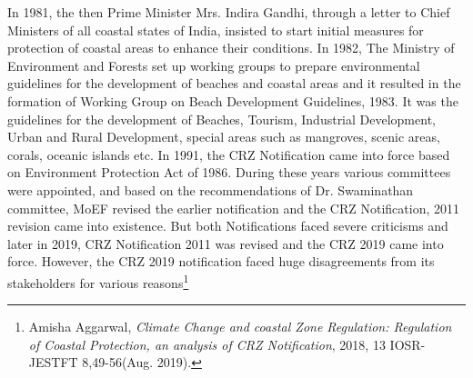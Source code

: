 \begin{multicols}{2}

\noi
In 1981, the then Prime Minister Mrs. Indira Gandhi, through a letter to Chief Ministers of all
coastal states of India, insisted to start initial measures for protection of coastal areas to
enhance their conditions. In 1982, The Ministry of Environment and Forests set up working
groups to prepare environmental guidelines for the development of beaches and coastal areas
and it resulted in the formation of Working Group on Beach Development Guidelines, 1983.
It was the guidelines for the development of Beaches, Tourism, Industrial Development,
Urban and Rural Development, special areas such as mangroves, scenic areas, corals, oceanic
islands etc. In 1991, the CRZ Notification came into force based on Environment Protection
Act of 1986. During these years various committees were appointed, and based on the
recommendations of Dr. Swaminathan committee, MoEF revised the earlier notification and the CRZ Notification, 2011 revision came into existence. But both Notifications faced severe
criticisms and later in 2019, CRZ Notification 2011 was revised and the CRZ 2019 came into
force. However, the CRZ 2019 notification faced huge disagreements from its stakeholders
for various reasons\footnote{Amisha Aggarwal, \textit{Climate Change and coastal Zone Regulation: Regulation of Coastal Protection, an analysis of CRZ Notification}, 2018, 13 IOSR-JESTFT 8,49-56(Aug. 2019).}



\end{multicols}
